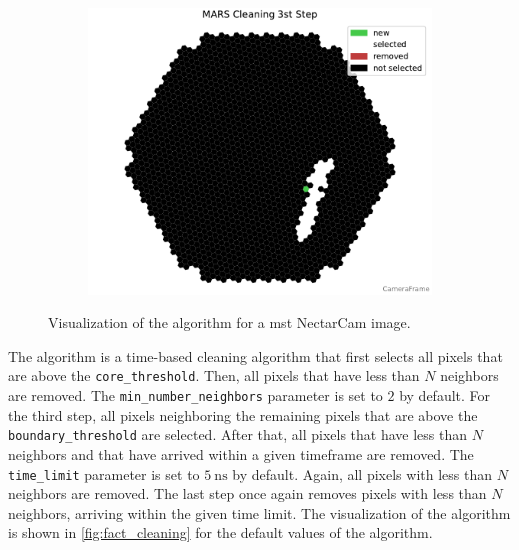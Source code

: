 \begin{figure}
\begin{subfigure}[t]{0.32\textwidth}
    \end{subfigure}
    \hfill
    \begin{subfigure}[t]{0.32\textwidth}
        \includegraphics[width=\textwidth]{plots/cleaner_steps/mars_3.pdf}
    \end{subfigure}
    \caption{Visualization of the \mars{} algorithm for a \gls{mst} NectarCam image.}
    \label{fig:mars_cleaning}
\end{figure}

The \fact{} algorithm is a time-based cleaning algorithm that first selects all pixels that are above
the \texttt{core\_threshold}. Then, all pixels that have less than \(N\) neighbors are removed. The
\texttt{min\_number\_neighbors} parameter is set to \(\num{2}\) by default. For the third step, all pixels neighboring
the remaining pixels that are above the \texttt{boundary\_threshold} are selected. After that, all
pixels that have less than \(N\) neighbors and that have arrived within a given timeframe are removed.
The \texttt{time\_limit} parameter is set to \(\SI{5}{\nano\second}\) by default. Again, all pixels
with less than \(N\) neighbors are removed. The last step once again removes pixels with less than
\(N\) neighbors, arriving within the given time limit. The visualization of the algorithm is shown in
\autoref{fig:fact_cleaning} for the default values of the algorithm.

